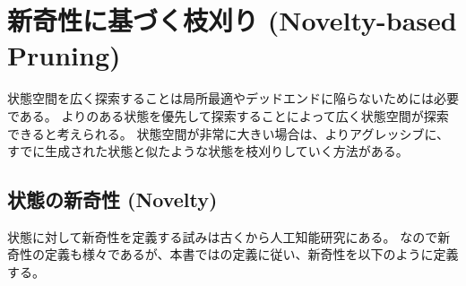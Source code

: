 





\section{新奇性に基づく枝刈り (Novelty-based Pruning)}
\label{sec:novelty-based-pruning}


状態空間を広く探索することは局所最適やデッドエンドに陥らないためには必要である。
よりのある状態を優先して探索することによって広く状態空間が探索できると考えられる。
状態空間が非常に大きい場合は、よりアグレッシブに、すでに生成された状態と似たような状態を枝刈りしていく方法がある。




\subsection{状態の新奇性 (Novelty)}
\label{sec:novelty}

状態に対して新奇性を定義する試みは古くから人工知能研究にある\cite{lehman2008exploiting}。
なので新奇性の定義も様々であるが、本書では\cite{geffner2015}の定義に従い、新奇性を以下のように定義する。


